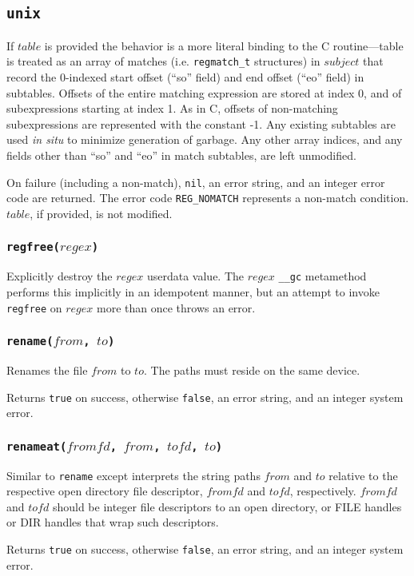 \documentclass[11pt, oneside]{memoir}
\newcommand*{\true}[0]{\texttt{true}\xspace}
\newcommand*{\false}[0]{\texttt{false}\xspace}
\newcommand*{\nil}[0]{\texttt{nil}\xspace}
\newcommand*{\syscall}[1]{\texttt{#1}\xspace}
\newcommand*{\fn}[1]{\texttt{#1}\xspace}
\newcounter{toccols}
\newenvironment{Module}[1]{
	\subsection{\texttt{#1}}
	\addtocontents{toc}{
		\protect\begin{multicols}{\value{toccols}}
	}
}{
	\addtocontents{toc}{\protect\end{multicols}}
}
\begin{document}
\begin{Module}{unix}
If $table$ is provided the behavior is a more literal binding to the C routine---table is treated as an array of matches (i.e. \texttt{regmatch\_t} structures) in $subject$ that record the 0-indexed start offset (``so'' field) and end offset (``eo'' field) in subtables. Offsets of the entire matching expression are stored at index 0, and of subexpressions starting at index 1. As in C, offsets of non-matching subexpressions are represented with the constant -1. Any existing subtables are used \textit{in situ} to minimize generation of garbage. Any other array indices, and any fields other than ``so'' and ``eo'' in match subtables, are left unmodified.

On failure (including a non-match), \nil, an error string, and an integer error code are returned. The error code \texttt{REG\_NOMATCH} represents a non-match condition. $table$, if provided, is not modified.

\subsubsection[\fn{regfree}]{\fn{regfree($regex$)}}

Explicitly destroy the $regex$ userdata value. The $regex$ \texttt{\_\_gc} metamethod performs this implicitly in an idempotent manner, but an attempt to invoke \fn{regfree} on $regex$ more than once throws an error.

\subsubsection[\fn{rename}]{\fn{rename($from$, $to$)}}

Renames the file $from$ to $to$. The paths must reside on the same device.

Returns \true on success, otherwise \false, an error string, and an integer system error.

\subsubsection[\fn{renameat}]{\fn{renameat($fromfd$, $from$, $tofd$, $to$)}}

Similar to \syscall{rename} except interprets the string paths $from$ and $to$ relative to the respective open directory file descriptor, $fromfd$ and $tofd$, respectively. $fromfd$ and $tofd$ should be integer file descriptors to an open directory, or FILE handles or DIR handles that wrap such descriptors.

Returns \true on success, otherwise \false, an error string, and an integer system error.


\end{Module}
\end{document}
